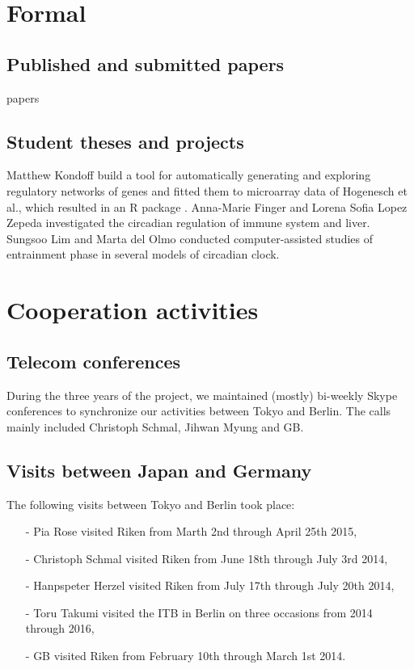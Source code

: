 \documentclass[a4paper]{article}
\begin{document}
\section{Formal}

\subsection{Published and submitted papers}
papers
\cite{bordyugov2015tuning,schmal2015theoretical,kondoff2015modeling,schmal2017moran,wagner2017plant,myung2017choroid,schmal2017measuring}

\subsection{Student theses and projects}
Matthew Kondoff build a tool for automatically generating and
exploring regulatory networks of genes and fitted them to microarray
data of Hogenesch et al., which resulted in an R package
\cite{kondoff2015modeling}. Anna-Marie Finger and Lorena Sofia Lopez
Zepeda investigated the circadian regulation of immune system and
liver.  Sungsoo Lim and Marta del Olmo conducted computer-assisted
studies of entrainment phase in several models of circadian clock.



\section{Cooperation activities}

\subsection{Telecom conferences}
During the three years of the project, we maintained (mostly)
bi-weekly Skype conferences to synchronize our activities between
Tokyo and Berlin. The calls mainly included Christoph Schmal, Jihwan
Myung and GB.

\subsection{Visits between Japan and Germany}
The following visits between Tokyo and Berlin took place:
\begin{itemize}
  \item[-] Pia Rose visited Riken from Marth 2nd through April 25th 2015,
  \item[-] Christoph Schmal visited Riken from June 18th through July 3rd
  2014,
  \item[-] Hanpspeter Herzel visited Riken from July 17th through July
  20th 2014,
  \item[-] Toru Takumi visited the ITB in Berlin on three occasions from
  2014 through 2016,
  \item[-] GB visited Riken from February 10th through March 1st 2014.
\end{itemize}
\end{document}

